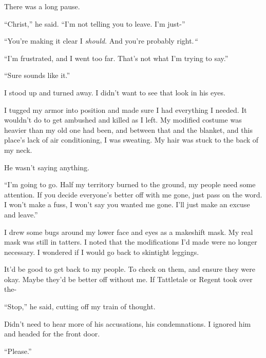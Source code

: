 There was a long pause.



``Christ,'' he said.  ``I'm not telling you to leave.  I'm just-''



``You're making it clear I \emph{should}\emph{.  }And you're probably right.\emph{``}



``I'm frustrated, and I went too far.  That's not what I'm trying to say.''



``Sure sounds like it.''



I stood up and turned away.  I didn't want to see that look in his eyes.



I tugged my armor into position and made sure I had everything I needed.  It wouldn't do to get ambushed and killed as I left.  My modified costume was heavier than my old one had been, and between that and the blanket, and this place's lack of air conditioning, I was sweating.  My hair was stuck to the back of my neck.



He wasn't saying anything.



``I'm going to go.  Half my territory burned to the ground, my people need some attention.  If you decide everyone's better off with me gone, just pass on the word.  I won't make a fuss, I won't say you wanted me gone.  I'll just make an excuse and leave.''



I drew some bugs around my lower face and eyes as a makeshift mask.  My real mask was still in tatters.  I noted that the modifications I'd made were no longer necessary.  I wondered if I would go back to skintight leggings.



It'd be good to get back to my people.  To check on them, and ensure they were okay.  Maybe they'd be better off without me.  If Tattletale or Regent took over the-



``Stop,'' he said, cutting off my train of thought.



Didn't need to hear more of his accusations, his condemnations.  I ignored him and headed for the front door.



``Please.''




